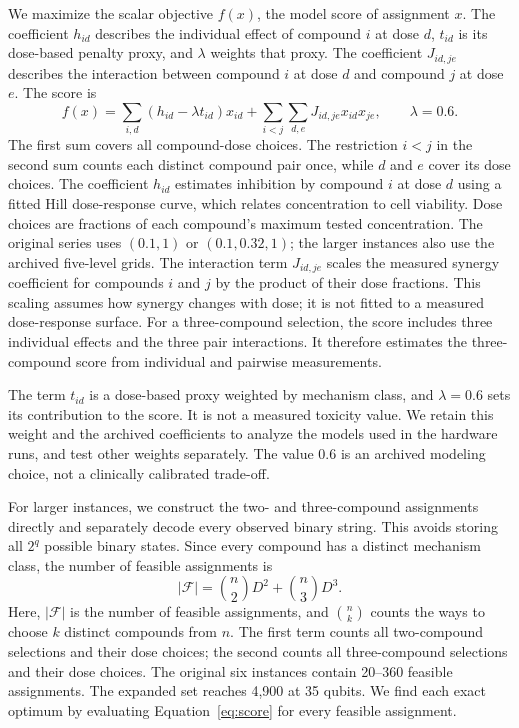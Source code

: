 \documentclass[utf8]{FrontiersinHarvard}
\newcommand{\Fset}{\mathcal{F}}
\begin{document}
We maximize the scalar objective $f(x)$, the model score of assignment $x$. The coefficient $h_{id}$ describes the individual effect of compound $i$ at dose $d$, $t_{id}$ is its dose-based penalty proxy, and $\lambda$ weights that proxy. The coefficient $J_{id,je}$ describes the interaction between compound $i$ at dose $d$ and compound $j$ at dose $e$. The score is
\begin{equation}
 f(x)=\sum_{i,d}(h_{id}-\lambda t_{id})x_{id}
       +\sum_{i<j}\sum_{d,e}J_{id,je}x_{id}x_{je},\qquad\lambda=0.6.
 \label{eq:score}
\end{equation}
The first sum covers all compound-dose choices. The restriction $i<j$ in the second sum counts each distinct compound pair once, while $d$ and $e$ cover its dose choices. The coefficient $h_{id}$ estimates inhibition by compound $i$ at dose $d$ using a fitted Hill dose-response curve, which relates concentration to cell viability. Dose choices are fractions of each compound's maximum tested concentration. The original series uses $(0.1,1)$ or $(0.1,0.32,1)$; the larger instances also use the archived five-level grids. The interaction term $J_{id,je}$ scales the measured synergy coefficient for compounds $i$ and $j$ by the product of their dose fractions. This scaling assumes how synergy changes with dose; it is not fitted to a measured dose-response surface. For a three-compound selection, the score includes three individual effects and the three pair interactions. It therefore estimates the three-compound score from individual and pairwise measurements.

The term $t_{id}$ is a dose-based proxy weighted by mechanism class, and $\lambda=0.6$ sets its contribution to the score. It is not a measured toxicity value. We retain this weight and the archived coefficients to analyze the models used in the hardware runs, and test other weights separately. The value 0.6 is an archived modeling choice, not a clinically calibrated trade-off.

For larger instances, we construct the two- and three-compound assignments directly and separately decode every observed binary string. This avoids storing all $2^q$ possible binary states. Since every compound has a distinct mechanism class, the number of feasible assignments is
\begin{equation}
 |\Fset|=\binom{n}{2}D^2+\binom{n}{3}D^3.
 \label{eq:count}
\end{equation}
Here, $|\Fset|$ is the number of feasible assignments, and $\binom{n}{k}$ counts the ways to choose $k$ distinct compounds from $n$. The first term counts all two-compound selections and their dose choices; the second counts all three-compound selections and their dose choices. The original six instances contain 20--360 feasible assignments. The expanded set reaches 4,900 at 35 qubits. We find each exact optimum by evaluating Equation~\ref{eq:score} for every feasible assignment.
\end{document}
